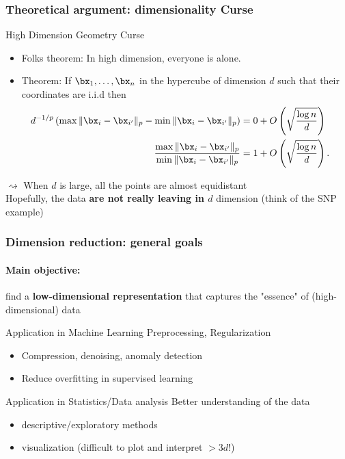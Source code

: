 \documentclass{beamer}\usepackage[]{graphicx}\usepackage[]{color}
\begin{document}
\begin{frame}
\frametitle{Theoretical argument: dimensionality Curse}

\begin{block}{High Dimension Geometry Curse}
\begin{itemize}
\item Folks theorem: In high dimension, everyone is alone.
\item Theorem: If $\bx_1,\ldots, \bx_n$ in the
hypercube of dimension $d$  such
that their coordinates are i.i.d then
\begin{align*}
\mspace{-20mu} d^{-1/p} \left( \max \|\bx_i-\bx_{i'}\|_p - \min \|\bx_i-\bx_{i'}\|_p
\right)  &= 0 + O\left(\sqrt{\frac{\log n}{d}}\right)\\
\frac{\max \|\bx_i-\bx_{i'}\|_p}{\min \|\bx_i-\bx_{i'}\|_p} &= 1 +
O\left(\sqrt{\frac{\log n}{d}}\right).
\end{align*}
\end{itemize}
\end{block}

  $\rightsquigarrow$ When $d$ is large, all the points are almost equidistant\\

  Hopefully, the data \alert{\bf are not really leaving in $d$} dimension (think of the SNP example)

\end{frame}

\begin{frame}[label=DimensionReduction]
  \frametitle{Dimension reduction: general goals}

  \paragraph{Main objective:} find a \alert{\bf low-dimensional representation} that captures the "essence" of (high-dimensional) data

  \vfill

  \begin{block}{Application in Machine Learning}
  \alert{Preprocessing, Regularization}
  \begin{itemize}
    \item Compression, denoising,  anomaly detection
    \item Reduce overfitting in supervised learning
  \end{itemize}
  \end{block}

\vfill

  \begin{block}{Application in Statistics/Data analysis}
    \alert{Better understanding of the data}
    \begin{itemize}
      \item descriptive/exploratory methods
      \item visualization (difficult to plot and interpret $> 3d$!)
    \end{itemize}
  \end{block}

\end{frame}
\end{document}

